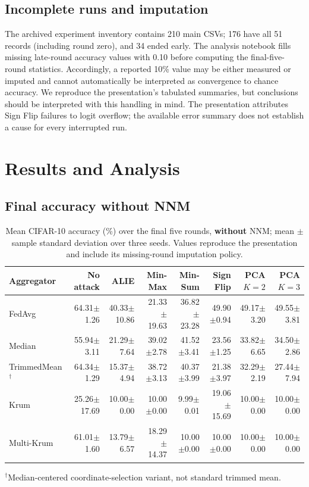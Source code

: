 \documentclass[11pt,a4paper]{article}
\begin{document}
\subsection{Incomplete runs and imputation}
The archived experiment inventory contains 210 main CSVs; 176 have all 51 records (including round zero), and 34 ended early. The analysis notebook fills missing late-round accuracy values with 0.10 before computing the final-five-round statistics. Accordingly, a reported 10\% value may be either measured or imputed and cannot automatically be interpreted as convergence to chance accuracy. We reproduce the presentation's tabulated summaries, but conclusions should be interpreted with this handling in mind. The presentation attributes Sign Flip failures to logit overflow; the available error summary does not establish a cause for every interrupted run.

\section{Results and Analysis}
\subsection{Final accuracy without NNM}
\begin{table}[htbp]\centering\caption{Mean CIFAR-10 accuracy (\%) over the final five rounds, \textbf{without} NNM; mean $\pm$ sample standard deviation over three seeds. Values reproduce the presentation and include its missing-round imputation policy.}\label{tab:raw}\scriptsize\setlength{\tabcolsep}{3pt}
\begin{tabular}{lrrrrrrr}\toprule
Aggregator & No attack & ALIE & Min-Max & Min-Sum & Sign Flip & PCA $K=2$ & PCA $K=3$\\\midrule
FedAvg & 64.31$\pm$1.26 & 40.33$\pm$10.86 & 21.33$\pm$19.63 & 36.82$\pm$23.28 & 49.90$\pm$0.94 & 49.17$\pm$3.20 & 49.55$\pm$3.81\\
Median & 55.94$\pm$3.11 & 21.29$\pm$7.64 & 39.02$\pm$2.78 & 41.52$\pm$3.41 & 23.56$\pm$1.25 & 33.82$\pm$6.65 & 34.50$\pm$2.86\\
TrimmedMean$^\dagger$ & 64.34$\pm$1.29 & 15.37$\pm$4.94 & 38.72$\pm$3.13 & 40.37$\pm$3.99 & 21.38$\pm$3.97 & 32.29$\pm$2.19 & 27.44$\pm$7.94\\
Krum & 25.26$\pm$17.69 & 10.00$\pm$0.00 & 10.00$\pm$0.00 & 9.99$\pm$0.01 & 19.06$\pm$15.69 & 10.00$\pm$0.00 & 10.00$\pm$0.00\\
Multi-Krum & 61.01$\pm$1.60 & 13.79$\pm$6.57 & 18.29$\pm$14.37 & 10.00$\pm$0.00 & 10.00$\pm$0.00 & 10.00$\pm$0.00 & 10.00$\pm$0.00\\\bottomrule
\end{tabular}
\par\smallskip\raggedright\footnotesize $^\dagger$Median-centered coordinate-selection variant, not standard trimmed mean.
\end{table}
\end{document}
